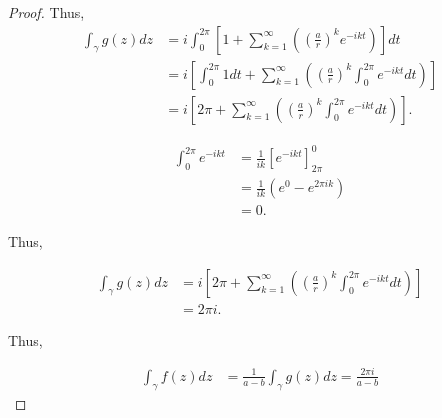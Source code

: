 \documentclass{article}
\begin{document}
\begin{proof}
    Thus, 
    \begin{align*}
        \int_{\gamma}^{} g(z) dz &= i \int_{0}^{2\pi} \left[1 + \sum_{k = 1}^{\infty} \left(\left(\frac{a}{r}\right)^ke^{-ikt}\right) \right] dt \\
        &= i \left[\int_{0}^{2\pi} 1 dt + \sum_{k = 1}^{\infty} \left(\left(\frac{a}{r}\right)^k \int_{0}^{2\pi} e^{-ikt} dt\right) \right] \\
        &= i \left[2\pi + \sum_{k = 1}^{\infty} \left(\left(\frac{a}{r}\right)^k \int_{0}^{2\pi} e^{-ikt} dt\right) \right].
    \end{align*}

    \begin{align*}
        \int_{0}^{2\pi} e^{-ikt} &= \frac{1}{ik} \left[e^{-ikt}\right]^{0}_{2\pi} \\
        &= \frac{1}{ik}(e^{0} - e^{2\pi ik}) \\
        &= 0.
    \end{align*}

    Thus,
    
    \begin{align*}
        \int_{\gamma}^{} g(z) dz &= i \left[2\pi + \sum_{k = 1}^{\infty} \left(\left(\frac{a}{r}\right)^k \int_{0}^{2\pi} e^{-ikt} dt\right) \right] \\
        &= 2\pi i.
    \end{align*}

    Thus, 

    \begin{align*}
        \int_{\gamma}^{} f(z) dz &= \frac{1}{a - b} \int_{\gamma}^{} g(z) dz = \frac{2\pi i}{a - b}
    \end{align*}
\end{proof}
\end{document}
